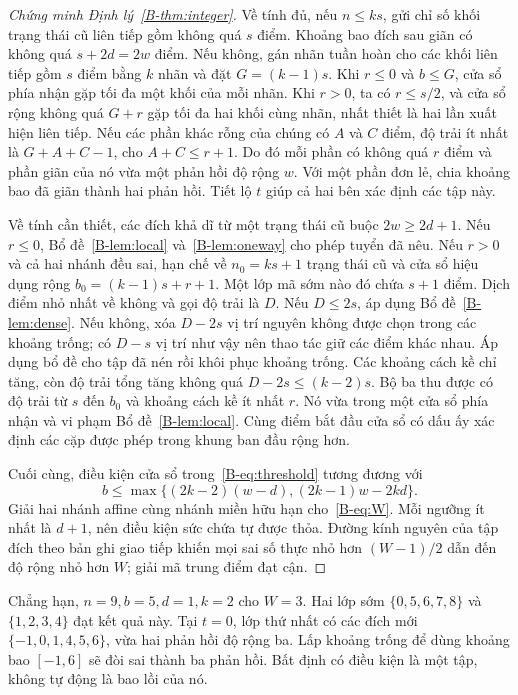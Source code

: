 \begin{proof}[Chứng minh Định lý~\ref{B-thm:integer}]
Về tính đủ, nếu $n\leq ks$, gửi chỉ số khối trạng thái cũ liên tiếp gồm không quá $s$ điểm. Khoảng bao đích sau giãn có không quá $s+2d=2w$ điểm. Nếu không, gán nhãn tuần hoàn cho các khối liên tiếp gồm $s$ điểm bằng $k$ nhãn và đặt $G=(k-1)s$. Khi $r\leq0$ và $b\leq G$, cửa sổ phía nhận gặp tối đa một khối của mỗi nhãn. Khi $r>0$, ta có $r\leq s/2$, và cửa sổ rộng không quá $G+r$ gặp tối đa hai khối cùng nhãn, nhất thiết là hai lần xuất hiện liên tiếp. Nếu các phần khác rỗng của chúng có $A$ và $C$ điểm, độ trải ít nhất là $G+A+C-1$, cho $A+C\leq r+1$. Do đó mỗi phần có không quá $r$ điểm và phần giãn của nó vừa một phản hồi độ rộng $w$. Với một phần đơn lẻ, chia khoảng bao đã giãn thành hai phản hồi. Tiết lộ $t$ giúp cả hai bên xác định các tập này.

Về tính cần thiết, các đích khả dĩ từ một trạng thái cũ buộc $2w\geq2d+1$. Nếu $r\leq0$, Bổ đề~\ref{B-lem:local} và~\ref{B-lem:oneway} cho phép tuyển đã nêu. Nếu $r>0$ và cả hai nhánh đều sai, hạn chế về $n_0=ks+1$ trạng thái cũ và cửa sổ hiệu dụng rộng $b_0=(k-1)s+r+1$. Một lớp mã sớm nào đó chứa $s+1$ điểm. Dịch điểm nhỏ nhất về không và gọi độ trải là $D$. Nếu $D\leq2s$, áp dụng Bổ đề~\ref{B-lem:dense}. Nếu không, xóa $D-2s$ vị trí nguyên không được chọn trong các khoảng trống; có $D-s$ vị trí như vậy nên thao tác giữ các điểm khác nhau. Áp dụng bổ đề cho tập đã nén rồi khôi phục khoảng trống. Các khoảng cách kề chỉ tăng, còn độ trải tổng tăng không quá $D-2s\leq(k-2)s$. Bộ ba thu được có độ trải từ $s$ đến $b_0$ và khoảng cách kề ít nhất $r$. Nó vừa trong một cửa sổ phía nhận và vi phạm Bổ đề~\ref{B-lem:local}. Cùng điểm bắt đầu cửa sổ có dấu ấy xác định các cặp được phép trong khung ban đầu rộng hơn.

Cuối cùng, điều kiện cửa sổ trong~\eqref{B-eq:threshold} tương đương với
\begin{equation}\label{B-eq:affine}
b\leq\max\{(2k-2)(w-d),(2k-1)w-2kd\}.
\end{equation}
Giải hai nhánh affine cùng nhánh miền hữu hạn cho~\eqref{B-eq:W}. Mỗi ngưỡng ít nhất là $d+1$, nên điều kiện sức chứa tự được thỏa. Đường kính nguyên của tập đích theo bản ghi giao tiếp khiến mọi sai số thực nhỏ hơn $(W-1)/2$ dẫn đến độ rộng nhỏ hơn $W$; giải mã trung điểm đạt cận.
\end{proof}

Chẳng hạn, $n=9,b=5,d=1,k=2$ cho $W=3$. Hai lớp sớm $\{0,5,6,7,8\}$ và $\{1,2,3,4\}$ đạt kết quả này. Tại $t=0$, lớp thứ nhất có các đích mới $\{-1,0,1,4,5,6\}$, vừa hai phản hồi độ rộng ba. Lấp khoảng trống để dùng khoảng bao $[-1,6]$ sẽ đòi sai thành ba phản hồi. Bất định có điều kiện là một tập, không tự động là bao lồi của nó.

